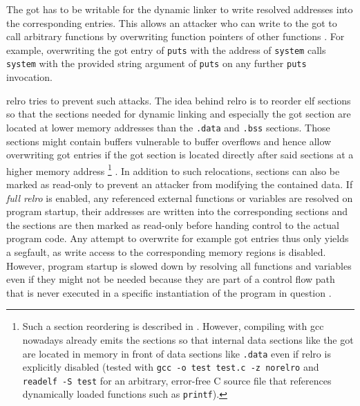The \gls{got} has to be writable for the dynamic linker to write resolved addresses into the corresponding entries.
This allows an attacker who can write to the \gls{got} to call arbitrary functions by overwriting function pointers of other functions \cite{Sidhpurwala2019}.
For example, overwriting the \gls{got} entry of \texttt{puts} with the address of \texttt{system} calls \texttt{system} with the provided string argument of \texttt{puts} on any further \texttt{puts} invocation.

\gls{relro} tries to prevent such attacks.
The idea behind \gls{relro} is to reorder \gls{elf} sections so that the sections needed for dynamic linking and especially the \gls{got} section are located at lower memory addresses than the \texttt{.data} and \texttt{.bss} sections.
Those sections might contain buffers vulnerable to buffer overflows and hence allow overwriting \gls{got} entries if the \gls{got} section is located directly after said sections at a higher memory address%
	\footnote{
		Such a section reordering is described in \cite[183]{Klein2011}.
		However, compiling with \gls{gcc} nowadays already emits the sections so that internal data sections like the \gls{got} are located in memory in front of data sections like \texttt{.data} even if \gls{relro} is explicitly disabled (tested with \texttt{gcc -o test test.c -z norelro} and \texttt{readelf -S test} for an arbitrary, error-free C source file that references dynamically loaded functions such as \texttt{printf}).
	}%
.
In addition to such relocations, sections can also be marked as read-only to prevent an attacker from modifying the contained data.
If \emph{full \gls{relro}} is enabled, any referenced external functions or variables are resolved on program startup, their addresses are written into the corresponding sections and the sections are then marked as read-only before handing control to the actual program code.
Any attempt to overwrite for example \gls{got} entries thus only yields a \gls{segfault}, as write access to the corresponding memory regions is disabled.
However, program startup is slowed down by resolving all functions and variables even if they might not be needed because they are part of a control flow path that is never executed in a specific instantiation of the program in question \cites[645\psqq]{Federico2015}[183\psqq]{Klein2011}{Sidhpurwala2019}.

